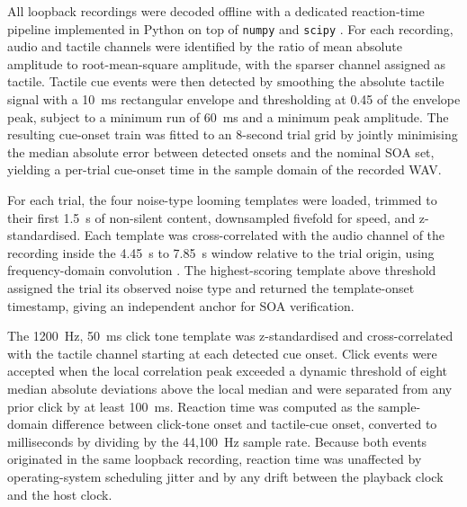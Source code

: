 All loopback recordings were decoded offline with a dedicated reaction-time pipeline implemented in Python on top of \texttt{numpy} and \texttt{scipy} \citep{Virtanen2020SciPy}. For each recording, audio and tactile channels were identified by the ratio of mean absolute amplitude to root-mean-square amplitude, with the sparser channel assigned as tactile. Tactile cue events were then detected by smoothing the absolute tactile signal with a 10~ms rectangular envelope and thresholding at 0.45 of the envelope peak, subject to a minimum run of 60~ms and a minimum peak amplitude. The resulting cue-onset train was fitted to an 8-second trial grid by jointly minimising the median absolute error between detected onsets and the nominal SOA set, yielding a per-trial cue-onset time in the sample domain of the recorded WAV.

For each trial, the four noise-type looming templates were loaded, trimmed to their first 1.5~s of non-silent content, downsampled fivefold for speed, and z-standardised. Each template was cross-correlated with the audio channel of the recording inside the 4.45~s to 7.85~s window relative to the trial origin, using frequency-domain convolution \citep{Virtanen2020SciPy}. The highest-scoring template above threshold assigned the trial its observed noise type and returned the template-onset timestamp, giving an independent anchor for SOA verification.

The 1200~Hz, 50~ms click tone template was z-standardised and cross-correlated with the tactile channel starting at each detected cue onset. Click events were accepted when the local correlation peak exceeded a dynamic threshold of eight median absolute deviations above the local median and were separated from any prior click by at least 100~ms. Reaction time was computed as the sample-domain difference between click-tone onset and tactile-cue onset, converted to milliseconds by dividing by the 44{,}100~Hz sample rate. Because both events originated in the same loopback recording, reaction time was unaffected by operating-system scheduling jitter and by any drift between the playback clock and the host clock.

